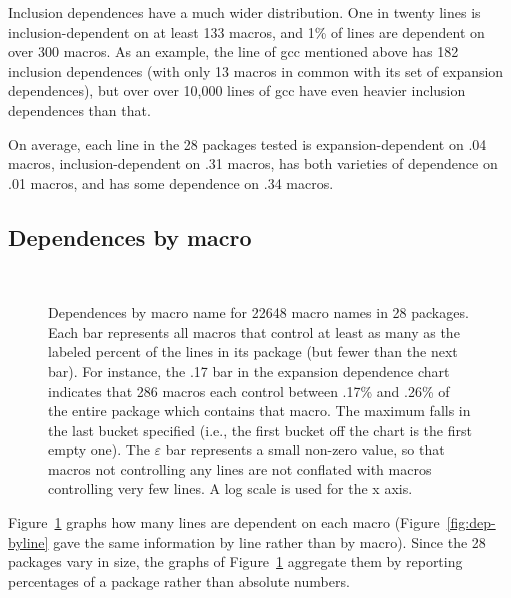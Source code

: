 \documentclass[10pt]{article}
\def\numpackageslesstwo{28}
\newcommand{\pkg}[1]{\textsf{#1}}
\newcommand{\captionsmall}[1]{\caption[]{\small #1}}
\begin{document}
Inclusion dependences have a much wider distribution.  One in twenty lines
is inclusion-dependent on at least 133 macros, and 1\% of lines are
dependent on over 300 macros.  As an example, the line of \pkg{gcc}
mentioned above has 182 inclusion dependences (with only 13 macros in
common with its set of expansion dependences), but over over 10,000 lines
of \pkg{gcc} have even heavier inclusion dependences than that.

On average, each line in the {\numpackageslesstwo} packages tested is 
expansion-dependent on .04 macros, inclusion-dependent on .31 macros, has
both varieties of dependence on .01 macros, and has some dependence on .34
macros.
      

\subsection{Dependences by macro}

\begin{figure}
\centerline{%
\ %
}
\captionsmall{Dependences by macro name for 22648 macro names in 28 packages.
  Each bar represents all macros that control at least as many as the
  labeled percent of the lines in its package (but fewer than the next
  bar).  For instance, the .17 bar in the expansion dependence chart
  indicates that 286 macros each control between .17\% and .26\% of the
  entire package which contains that macro.  The maximum falls in the last
  bucket specified (i.e., the first bucket off the chart is the first empty
  one).  The $\varepsilon$ bar represents a small non-zero value, so that
  macros not controlling any lines are not conflated with macros
  controlling very few lines.  A log scale is used for the x axis.}

\label{fig:dep-bymacro}
\end{figure}

Figure~\ref{fig:dep-bymacro} graphs how many lines are dependent on each
macro (Figure~\ref{fig:dep-byline} gave the same information by line rather
than by macro).  Since the {\numpackageslesstwo} packages vary in size, the
graphs of Figure~\ref{fig:dep-bymacro} aggregate them by reporting
percentages of a package rather than absolute numbers.
\end{document}
